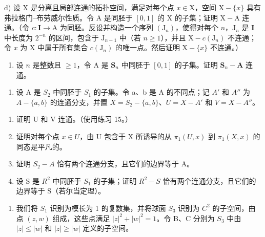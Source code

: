 d) 设 X 是分离且局部连通的拓扑空间，满足对每个点 \(x \in \mathrm{X}\)，空间 \(\mathrm{X} - \{x\}\) 具有弗拉格门–布劳威尔性质。令 A 是同胚于 \([0,1]\) 的 X 的子集；证明 \(\mathrm{X} - \mathrm{A}\) 连通。（令 \(c: \mathbf{I} \to \mathrm{A}\) 为同胚。反设并构造一个序列 \((\mathrm{J}_n)\)，使得对每个 \(n\)，\(\mathrm{J}_n\) 是 \(\mathbf{I}\) 中长度为 \(2^{-n}\) 的区间，包含于 \(\mathrm{J}_{n-1}\) 中（若 \(n \geqslant 1\)），并且 \(\mathrm{X} - c(\mathrm{J}_n)\) 不连通；令 \(x\) 为 X 中属于所有集合 \(c(\mathrm{J}_n)\) 的唯一点。然后证明 \(\mathrm{X} - \{x\}\) 不连通。）

\begin{enumerate}
\def\labelenumi{\alph{enumi})}
\setcounter{enumi}{4}
\tightlist
\item
  设 \(n\) 是整数且 \(\geqslant 1\)，令 A 是 \(\mathbf{S}_n\) 中同胚于 \([0,1]\) 的子集。证明 \(\mathbf{S}_n - \mathbf{A}\) 连通。
\end{enumerate}

\begin{enumerate}
\def\labelenumi{\arabic{enumi})}
\setcounter{enumi}{15}
\tightlist
\item
  设 A 是 \(S_{2}\) 中同胚于 \(S_{1}\) 的子集。令 a、b 是 A 的不同点；记 \(A'\) 和 \(A''\) 为 \(A-\{a,b\}\) 的连通分支，并置 \(X=S_{2}-\{a,b\}\)、\(U=X-A'\) 和 \(V=X-A''\)。
\end{enumerate}

\begin{enumerate}
\def\labelenumi{\alph{enumi})}
\item
  证明 U 和 V 连通。（使用练习 15。）
\item
  证明对每个点 \(x \in U\)，由 U 包含于 X 所诱导的从 \(\pi_{1}(U, x)\) 到 \(\pi_{1}(X, x)\) 的同态是平凡的。
\item
  证明 \(S_{2}-A\) 恰有两个连通分支，且它们的边界等于 A。
\item
  设 S 是 \(R^{2}\) 中同胚于 \(S_{1}\) 的子集；证明 \(R^{2}-S\) 恰有两个连通分支，且它们的边界等于 S（若尔当定理）。
\end{enumerate}

\begin{enumerate}
\def\labelenumi{\arabic{enumi})}
\setcounter{enumi}{16}
\tightlist
\item
  我们将 \(S_{1}\) 识别为模长为 1 的复数集，并将球面 \(S_{3}\) 识别为 \(C^{2}\) 的子空间，由点 \((z,w)\) 组成，这些点满足 \(|z|^{2} + |w|^{2} = 1\)。令 B、C 分别为 \(S_{3}\) 中由 \(|z| \leqslant |w|\) 和 \(|z| \geqslant |w|\) 定义的子空间。
\end{enumerate}

